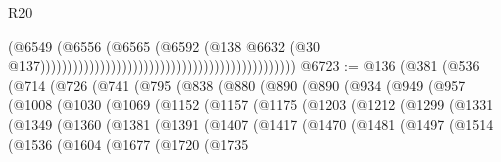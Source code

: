 \begin{lexlean}{R20}
\begin{coremodule}
{                                                                                      (@6549
                                                                                        (@6556
                                                                                          (@6565
                                                                                            (@6592
                                                                                              (@138
                                                                                                @6632
                                                                                                (@30
                                                                                                  @137)))))))))))))))))))))))))))))))))))))))))))))))
@6723 := @136
    (@381
      (@536
        (@714
          (@726
            (@741
              (@795
                (@838
                  (@880
                    (@890
                      (@890
                        (@934
                          (@949
                            (@957
                              (@1008
                                (@1030
                                  (@1069
                                    (@1152
                                      (@1157
                                        (@1175
                                          (@1203
                                            (@1212
                                              (@1299
                                                (@1331
                                                  (@1349
                                                    (@1360
                                                      (@1381
                                                        (@1391
                                                          (@1407
                                                            (@1417
                                                              (@1470
                                                                (@1481
                                                                  (@1497
                                                                    (@1514
                                                                      (@1536
                                                                        (@1604
                                                                          (@1677
                                                                            (@1720
                                                                              (@1735
}
\end{coremodule}
\end{lexlean}
